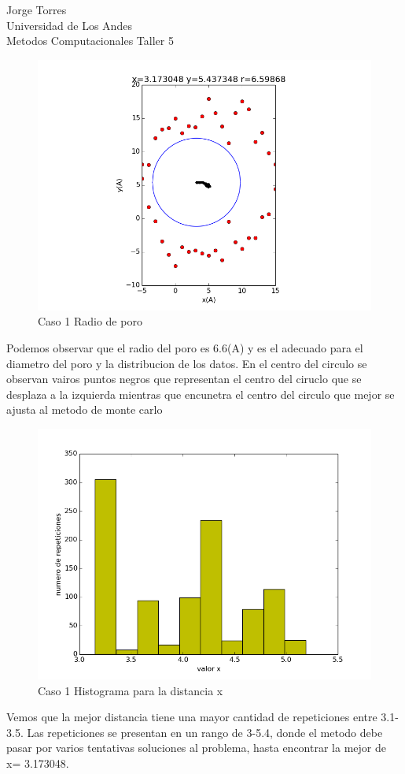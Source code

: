 \documentclass{article}
\begin{document}
Jorge Torres\\
Universidad de Los Andes\\
Metodos Computacionales Taller 5\\
\vspace{1cm}

\begin{figure}[h!]
  \includegraphics[scale=0.7]{radio_de_poro.png}
  \caption{Caso 1 Radio de poro }
\end{figure}
Podemos observar que el radio del poro es 6.6(A) y es el adecuado para el diametro del poro y la distribucion de los datos. En el centro del circulo se observan vairos puntos negros que representan el centro del ciruclo que se desplaza a la izquierda mientras que encunetra el centro del circulo que mejor se ajusta al metodo de monte carlo\\

\newpage
\begin{figure}[h!]
  \includegraphics[scale=0.5]{histrogramax.png}
  \caption{Caso 1 Histograma para la distancia x  }
\end{figure}
Vemos que la mejor distancia tiene una mayor cantidad de repeticiones entre 3.1-3.5. Las repeticiones se presentan en un rango de 3-5.4, donde el metodo debe pasar por varios tentativas soluciones al problema, hasta encontrar la mejor de x= 3.173048.\\
\end{document}
